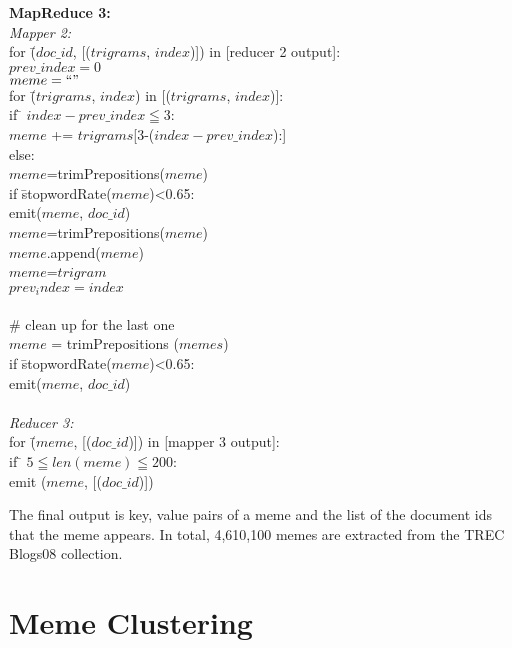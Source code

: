 \documentclass{sig-alternate}
\begin{document}
\begin{centering}
\begin{tabbing}
\textbf{MapReduce 3:}\\
\emph{Mapper 2:}\\

for \= ($doc\_id$, [($trigrams$, $index$)]) in [reducer 2 output]:\\
\>	$prev\_index=0$\\
\>	$meme=``"$\\
\>	for \= ($trigrams$, $index$) in [($trigrams$, $index$)]:\\
\>\>	if \= $index-prev\_index \leqq 3$:\\
\>\>\>		$meme$ += $trigrams$[3-($index-prev\_index$):]\\
\>\>	else:\\
\>\>\>		$meme$=trimPrepositions($meme$)\\
\>\>\>		if \= stopwordRate($meme$)<0.65:\\
\>\>\>\>		emit($meme$, $doc\_id$)\\
\>\>\>		$meme$=trimPrepositions($meme$)\\
\>\>\>		$meme$.append($meme$)\\
\>\>\>		$meme$=$trigram$\\
\>\>	$prev_index=index$\\
\\	
\>	\# clean up for the last one\\
\>		$meme$ = trimPrepositions ($memes$)\\
\>		if \= stopwordRate($meme$)<0.65:\\
\>\>		emit($meme$, $doc\_id$)\\
\\
\emph{Reducer 3:}\\
for \= ($meme$, [($doc\_id$)]) in [mapper 3 output]:\\
\> if \= $5 \leqq len(meme) \leqq 200$:\\
\>\>	emit ($meme$, [($doc\_id$)])

\end{tabbing}

\end{centering}

The final output is key, value pairs of a meme and the list of the document ids that the meme appears. In total, 4,610,100 memes are extracted from the TREC Blogs08 collection.

\section{Meme Clustering}
\end{document}

